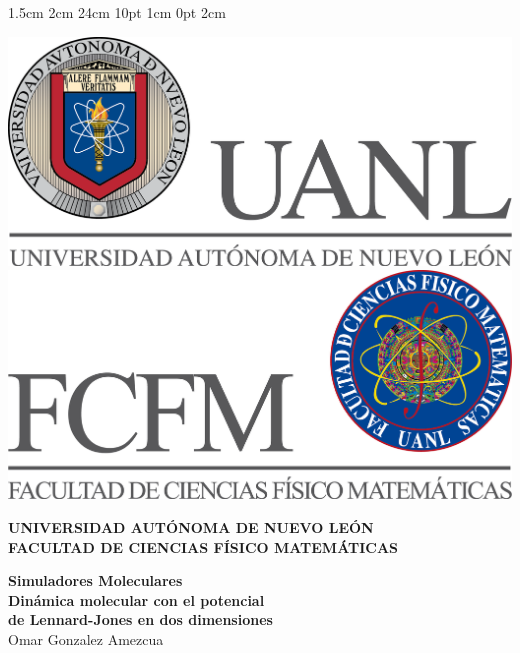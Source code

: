 \documentclass[12pt,letterpaper]{article}
\begin{document}
\setmargins{2.5cm}      
{1.5cm}                     
{2cm}  
{24cm}                    
{10pt}                          
{1cm}                          
{0pt}                             
{2cm}
\begin{titlepage}
\begin{center}
\includegraphics[scale=0.40]{../../../Logos/uanl.png} 
\hspace{2.5cm}
\includegraphics[scale=0.40]{../../../Logos/fcfm.png}
\end{center}
\vspace{2cm}
\begin{center}
\textbf{
UNIVERSIDAD AUTÓNOMA DE NUEVO LEÓN\\
FACULTAD DE CIENCIAS
FÍSICO MATEMÁTICAS}\\
\vspace*{2cm}
\begin{large}
\vspace{1cm}
\large{\textbf{Simuladores Moleculares}}\\
\textbf{Dinámica molecular con el potencial \\ de Lennard-Jones en dos dimensiones}\\
Omar Gonzalez Amezcua\\
\end{large}
\vspace{3.5cm}
\begin{minipage}{0.6\linewidth}

\end{minipage}
\end{center}
\end{titlepage}
\end{document}
